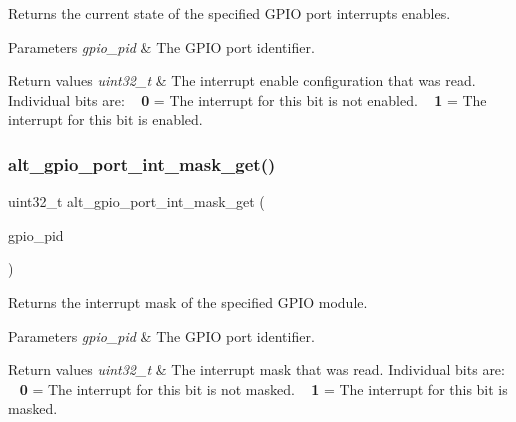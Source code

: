 Returns the current state of the specified G\+P\+IO port interrupts enables.


\begin{DoxyParams}{Parameters}
{\em gpio\+\_\+pid} & The G\+P\+IO port identifier.\\
\hline
\end{DoxyParams}

\begin{DoxyRetVals}{Return values}
{\em uint32\+\_\+t} & The interrupt enable configuration that was read. Individual bits are\+: ~\newline
 {\bfseries{0}} = The interrupt for this bit is not enabled. ~\newline
 {\bfseries{1}} = The interrupt for this bit is enabled. \\
\hline
\end{DoxyRetVals}
\mbox{\label{group__ALT__GPIO__INT_ga288661ea6e456980652610131cd0ad53}} 
\subsubsection{\texorpdfstring{alt\_gpio\_port\_int\_mask\_get()}{alt\_gpio\_port\_int\_mask\_get()}}
{\footnotesize\ttfamily uint32\+\_\+t alt\+\_\+gpio\+\_\+port\+\_\+int\+\_\+mask\+\_\+get (\begin{DoxyParamCaption}\item[{\mbox{\hyperlink{group__ALT__GPIO__API__CONFIG_gaaf1cf0e2a720d20cd883810f2b59097e}{A\+L\+T\+\_\+\+G\+P\+I\+O\+\_\+\+P\+O\+R\+T\+\_\+t}}}]{gpio\+\_\+pid }\end{DoxyParamCaption})}

Returns the interrupt mask of the specified G\+P\+IO module.


\begin{DoxyParams}{Parameters}
{\em gpio\+\_\+pid} & The G\+P\+IO port identifier.\\
\hline
\end{DoxyParams}

\begin{DoxyRetVals}{Return values}
{\em uint32\+\_\+t} & The interrupt mask that was read. Individual bits are\+: ~\newline
 {\bfseries{0}} = The interrupt for this bit is not masked. ~\newline
 {\bfseries{1}} = The interrupt for this bit is masked. \\
\hline
\end{DoxyRetVals}
\mbox{\label{group__ALT__GPIO__INT_ga1badd0295d3246014e8f4f36ad2fcf8b}} 
